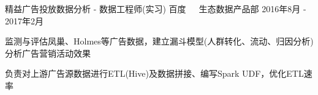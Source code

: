 \documentclass[11pt, a4paper, UTF8]{awesome-cv}
\begin{document}
\begin{cventries}
  \cventry
    {精益广告投放数据分析 - 数据工程师(实习)} %
    {百度{\ \cdotp\ \ }生态数据产品部} %
    {2016年8月 - 2017年2月} %
    {\ } %
    {
      \begin{cvitems} %
        \item {监测与评估凤巢、Holmes等广告数据，建立漏斗模型(人群转化、流动、归因分析)分析广告营销活动效果}
        \item {负责对上游广告源数据进行ETL(Hive)及数据拼接、编写Spark UDF，优化ETL速率}
      \end{cvitems}
    }
        
\end{cventries}
\end{document}
